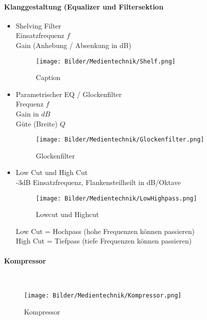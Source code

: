 \newpage
\paragraph{Klanggestaltung (Equalizer und Filtersektion}
\begin{itemize}
    \item Shelving Filter\\
        Einsatzfrequenz $f$\\
        Gain (Anhebung / Absenkung in dB)
        \begin{figure}[h]
            \centering
            \texttt{[image: Bilder/Medientechnik/Shelf.png]}
            \caption{Caption}
            \label{fig:Shelving EQ}
        \end{figure}

    \item Parametrischer EQ / Glockenfilter\\
        Frequenz $f$\\
        Gain in $dB$\\
        Güte (Breite) $Q$\\
        \begin{figure}[h]
            \centering
            \texttt{[image: Bilder/Medientechnik/Glockenfilter.png]}
            \caption{Glockenfilter}
            \label{fig:Parametrischer EQ}
        \end{figure}
    
    \item Low Cut und High Cut\\
        -3dB Einsatzfrequenz, Flankensteilheilt in dB/Oktave\\
\begin{figure}[h]
    \centering
    \texttt{[image: Bilder/Medientechnik/LowHighpass.png]}
    \caption{Lowcut und Highcut}
    \label{fig:Lowcut, Highcut}
\end{figure}
        Low Cut = Hochpass (hohe Frequenzen können passieren)\\
        High Cut = Tiefpass (tiefe Frequenzen können passieren)\\
\end{itemize}

\newpage

\paragraph{Kompressor}~
\begin{figure}[h]
    \centering
    \texttt{[image: Bilder/Medientechnik/Kompressor.png]}
    \caption{Kompressor}
    \label{fig:Kompressor}
\end{figure}

